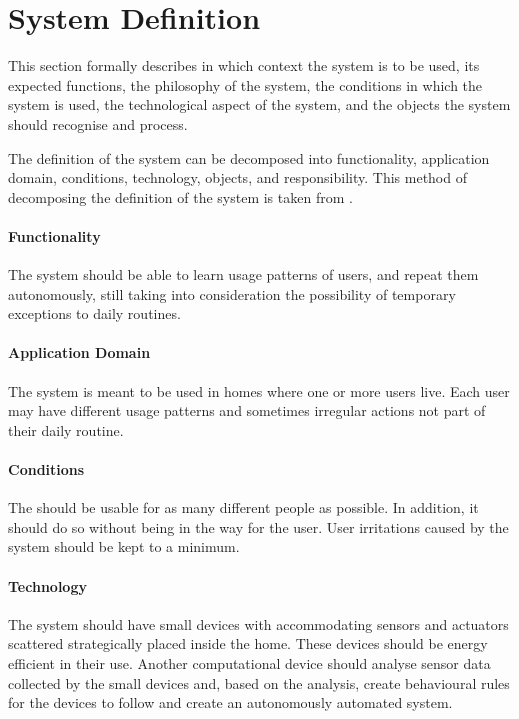 \section{System Definition}\label{sec:systemDefinition}

This section formally describes in which context the system is to be used, its expected functions, the philosophy of the system, the conditions in which the system is used, the technological aspect of the system, and the objects the system should recognise and process.

The definition of the system can be decomposed into functionality, application domain, conditions, technology, objects, and responsibility. This method of decomposing the definition of the system is taken from \cite{mathiassen2001objektorienteret}.

\paragraph{Functionality}
The system should be able to learn usage patterns of users, and repeat them autonomously, still taking into consideration the possibility of temporary exceptions to daily routines.

\paragraph{Application Domain}
The system is meant to be used in homes where one or more users live. Each user may have different usage patterns and sometimes irregular actions not part of their daily routine.

\paragraph{Conditions}
The should be usable for as many different people as possible. In addition, it should do so without being in the way for the user. User irritations caused by the system should be kept to a minimum.

\paragraph{Technology}
The system should have small devices with accommodating sensors and actuators scattered strategically placed inside the home. These devices should be energy efficient in their use. Another computational device should analyse sensor data collected by the small devices and, based on the analysis, create behavioural rules for the devices to follow and create an autonomously automated system.

